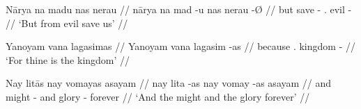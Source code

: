 \documentclass[12pt,paper=a4]{scrartcl}
\begin{document}
\ex
\begingl
    \glpreamble Nārya na madu nas nerau //
    \gla nārya na mad -u nas nerau -Ø //
    \glb but \GenT{} save -\Imp{} \Fpl{}.\Parg{} evil -\Top{} //
    \glft `But from evil save us' //
\endgl
\xe

\ex
\begingl
    \glpreamble Yanoyam vana lagasimas //
    \gla Yanoyam vana lagasim -as //
    \glb because \Ssg{}.\Gen{} kingdom -\Parg{} //
    \glft `For thine is the kingdom' //
\endgl
\xe

\ex
\begingl
    \glpreamble Nay litās nay vomayas asayam //
    \gla nay lita -as nay vomay -as asayam //
    \glb and might -\Parg{} and glory -\Parg{} forever //
    \glft `And the might and the glory forever' //
\endgl
\xe


\vfill
\printbibliography
\end{document}
